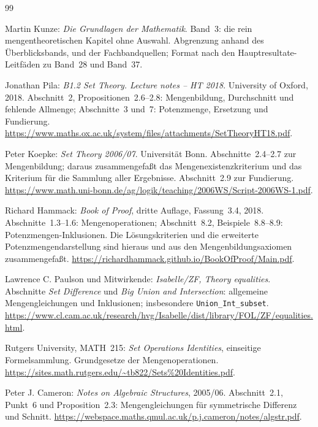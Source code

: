 \renewcommand{\bibname}{Quellen und Bandzuordnung}
\begin{thebibliography}{99}
\footnotesize
\setlength{\itemsep}{2pt}
\setlength{\parskip}{0pt}

Martin Kunze: \emph{Die Grundlagen der Mathematik}.
Band~3: die rein mengentheoretischen Kapitel ohne Auswahl.
Abgrenzung anhand des Überblicksbands,  und
der Fachbandquellen; Format nach den Hauptresultate-Leitfäden
zu Band~28 und Band~37.

Jonathan Pila: \emph{B1.2 Set Theory. Lecture notes -- HT 2018}.
University of Oxford, 2018.
Abschnitt~2, Propositionen~2.6--2.8: Mengenbildung,
Durchschnitt und fehlende Allmenge; Abschnitte~3 und~7:
Potenzmenge, Ersetzung und Fundierung.
\url{https://www.maths.ox.ac.uk/system/files/attachments/SetTheoryHT18.pdf}.

Peter Koepke: \emph{Set Theory 2006/07}.
Universität Bonn.
Abschnitte~2.4--2.7 zur Mengenbildung; daraus zusammengefaßt
das Mengenexistenzkriterium und das Kriterium für die Sammlung
aller Ergebnisse. Abschnitt~2.9 zur Fundierung.
\url{https://www.math.uni-bonn.de/ag/logik/teaching/2006WS/Script-2006WS-1.pdf}.

Richard Hammack: \emph{Book of Proof}, dritte Auflage,
Fassung~3.4, 2018.
Abschnitte~1.3--1.6: Mengenoperationen;
Abschnitt~8.2, Beispiele~8.8--8.9: Potenzmengen-Inklusionen.
Die Lösungskriterien und die erweiterte Potenzmengendarstellung
sind hieraus und aus den Mengenbildungsaxiomen zusammengefaßt.
\url{https://richardhammack.github.io/BookOfProof/Main.pdf}.

Lawrence C. Paulson und Mitwirkende:
\emph{Isabelle/ZF, Theory equalities}.
Abschnitte \emph{Set Difference} und
\emph{Big Union and Intersection}: allgemeine Mengengleichungen
und Inklusionen; insbesondere \texttt{Union\_Int\_subset}.
\url{https://www.cl.cam.ac.uk/research/hvg/Isabelle/dist/library/FOL/ZF/equalities.html}.

Rutgers University, MATH~215:
\emph{Set Operations Identities}, einseitige Formelsammlung.
Grundgesetze der Mengenoperationen.
\url{https://sites.math.rutgers.edu/~tb822/Sets%20Identities.pdf}.

Peter J. Cameron: \emph{Notes on Algebraic Structures}, 2005/06.
Abschnitt~2.1, Punkt~6 und Proposition~2.3:
Mengengleichungen für symmetrische Differenz und Schnitt.
\url{https://webspace.maths.qmul.ac.uk/p.j.cameron/notes/algstr.pdf}.


\end{thebibliography}
